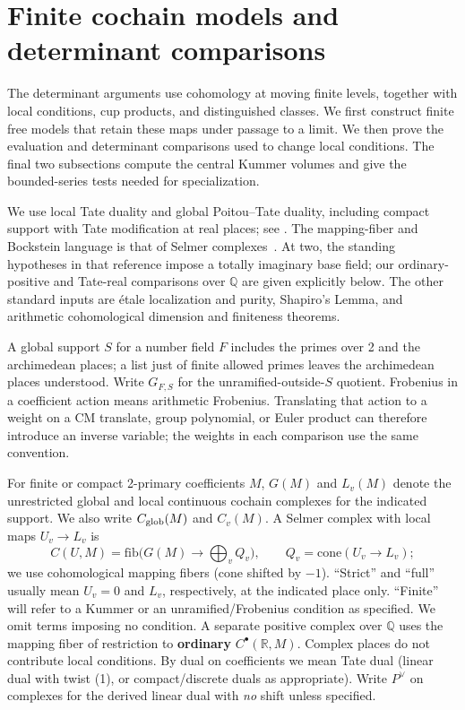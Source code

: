 \section{Finite cochain models and determinant comparisons}\label{sec:foundations}

The determinant arguments use cohomology at moving finite levels, together
with local conditions, cup products, and distinguished classes. We first
construct finite free models that retain these maps under passage to a
limit. We then prove the evaluation and determinant comparisons used to
change local conditions. The final two subsections compute the central
Kummer volumes and give the bounded-series tests needed for specialization.

We use local Tate duality and global Poitou--Tate duality, including compact
support with Tate modification at real places; see \cite{MilneADT}. The
mapping-fiber and Bockstein language is that of Selmer
complexes~\cite{Nekovar06}. At two, the standing hypotheses in that reference
impose a totally imaginary base field; our ordinary-positive and Tate-real
comparisons over \(\mathbb Q\) are given explicitly below. The other standard
inputs are étale localization and purity, Shapiro's Lemma, and arithmetic
cohomological dimension and finiteness theorems.

A global support \(S\) for a number field \(F\) includes the primes over 2
and the archimedean places; a list just of finite allowed primes leaves the
archimedean places understood. Write \(G_{F,S}\) for the
unramified-outside-\(S\) quotient. Frobenius in a coefficient action means
arithmetic Frobenius. Translating that action to a weight on a CM translate,
group polynomial, or Euler product can therefore introduce an inverse
variable; the weights in each comparison use the same convention.

For finite or compact 2-primary coefficients \(M\), \(G(M)\) and \(L_v(M)\) denote the unrestricted global and local continuous cochain complexes for the indicated support. We also write \(C_{\rm glob}(M)\) and \(C_v(M)\). A Selmer complex with local maps \(U_v\to L_v\) is
\[
 C(U,M)=\mathrm{fib}\big(G(M)\longrightarrow\bigoplus_v Q_v\big),\qquad
                Q_v=\mathrm{cone}(U_v\to L_v);
\]
we use cohomological mapping fibers (cone shifted by \(-1\)). “Strict” and “full” usually mean \(U_v=0\) and \(L_v\), respectively, at the indicated place only. “Finite” will refer to a Kummer or an unramified/Frobenius condition as specified. We omit terms imposing no condition. A separate positive complex over \(\mathbb Q\) uses the mapping fiber of restriction to \textbf{ordinary} \(C^\bullet(\mathbb R,M)\). Complex places do not contribute local conditions. By dual on coefficients we mean Tate dual (linear dual with twist (1), or compact/discrete duals as appropriate). Write \(P^\vee\) on complexes for the derived linear dual with \emph{no} shift unless specified.

